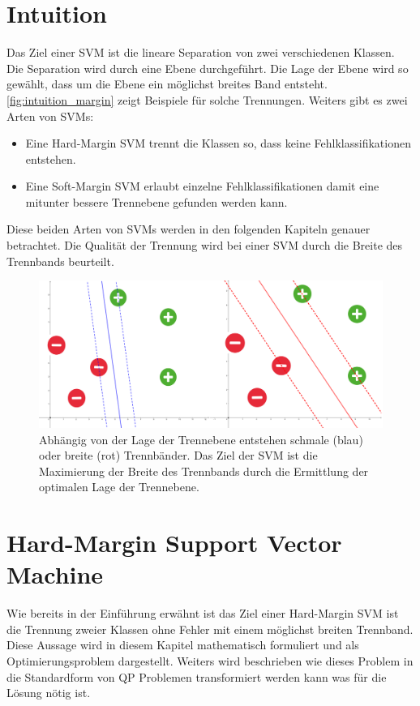 \documentclass[a4paper,11pt,twoside]{scrreprt}
\begin{document}
\chapter{Intuition}
Das Ziel einer \ac{SVM} ist die lineare Separation von zwei verschiedenen Klassen. Die Separation wird durch eine Ebene durchgeführt. Die Lage der Ebene wird so gewählt, dass um die Ebene ein möglichst breites Band entsteht. \autoref{fig:intuition_margin} zeigt Beispiele für solche Trennungen. Weiters gibt es zwei Arten von \acp{SVM}:

\begin{itemize}
	\item Eine Hard-Margin SVM trennt die Klassen so, dass keine Fehlklassifikationen entstehen. 
	\item Eine Soft-Margin SVM erlaubt einzelne Fehlklassifikationen damit eine mitunter bessere Trennebene gefunden werden kann.
\end{itemize}

Diese beiden Arten von \acp{SVM} werden in den folgenden Kapiteln genauer betrachtet. 
Die Qualität der Trennung wird bei einer \ac{SVM} durch die Breite des Trennbands beurteilt. 

\begin{figure}[H]
	\centering
	\includegraphics[width = 16cm]{assets/small_vs_big_margin.png}
	\caption{Abhängig von der Lage der Trennebene entstehen schmale (blau) oder breite (rot) Trennbänder. Das Ziel der \ac{SVM} ist die Maximierung der Breite des Trennbands durch die Ermittlung der optimalen Lage der Trennebene.}
	\label{fig:intuition_margin}
\end{figure}


\chapter{Hard-Margin Support Vector Machine} \label{sec:hard_margin}
Wie bereits in der Einführung erwähnt ist das Ziel einer Hard-Margin \ac{SVM} ist die Trennung zweier Klassen ohne Fehler mit einem möglichst breiten Trennband. Diese Aussage wird in diesem Kapitel mathematisch formuliert und als Optimierungsproblem dargestellt. Weiters wird beschrieben wie dieses Problem in die Standardform von \ac{QP} Problemen transformiert werden kann was für die Lösung nötig ist. 
\end{document}
